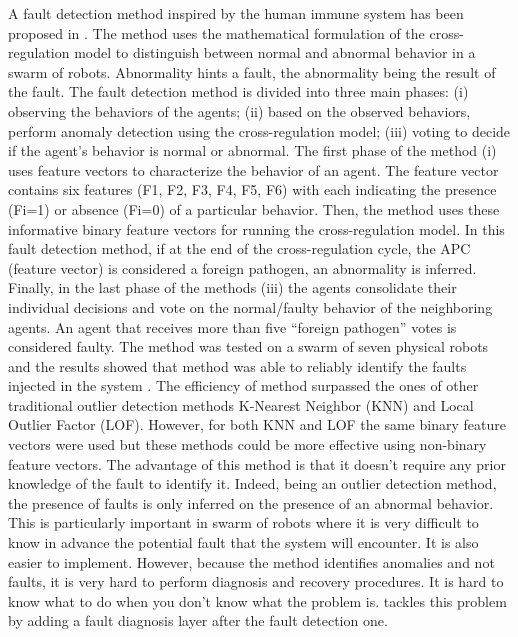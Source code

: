 A fault detection method inspired by the human immune system has been proposed in \cite{ tarapore2015err, tarapore2017generic}. The method uses the mathematical formulation of the cross-regulation model to distinguish between normal and abnormal behavior in a swarm of robots. Abnormality hints a fault, the abnormality being the result of the fault. The fault detection method is divided into three main phases: (i) observing the behaviors of the agents; (ii) based on the observed behaviors, perform anomaly detection using the cross-regulation model; (iii) voting to decide if the agent’s behavior is normal or abnormal.  The first phase of the method (i) uses feature vectors to characterize the behavior of an agent. The feature vector contains six features (F1, F2, F3, F4, F5, F6) with each indicating the presence (Fi=1) or absence (Fi=0) of a particular behavior. Then, the method uses these informative binary feature vectors for running the cross-regulation model. In this fault detection method, if at the end of the cross-regulation cycle, the APC (feature vector) is considered a foreign pathogen, an abnormality is inferred. Finally, in the last phase of the methods (iii) the agents consolidate their individual decisions and vote on the normal/faulty behavior of the neighboring agents. An agent that receives more than five “foreign pathogen” votes is considered faulty. The method was tested on a swarm of seven physical robots and the results showed that method was able to reliably identify the faults injected in the system \cite{tarapore2019fault}. The efficiency of method surpassed the ones of other traditional outlier detection methods K-Nearest Neighbor (KNN) and Local Outlier Factor (LOF). However, for both KNN and LOF the same binary feature vectors were used but these methods could be more effective using non-binary feature vectors. The advantage of this method is that it doesn’t require any prior knowledge of the fault to identify it. Indeed, being an outlier detection method, the presence of faults is only inferred on the presence of an abnormal behavior. This is particularly important in swarm of robots where it is very difficult to know in advance the potential fault that the system will encounter. It is also easier to implement. However, because the method identifies anomalies and not faults, it is very hard to perform diagnosis and recovery procedures. It is hard to know what to do when you don’t know what the problem is. \cite{okeefe2018adaptive} tackles this problem by adding a fault diagnosis layer after the fault detection one. 

